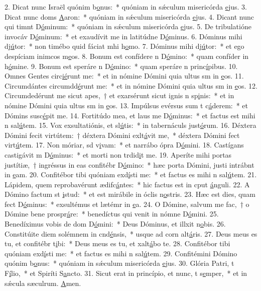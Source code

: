 2. Dicat nunc Israël quónim b\uline{o}nus:~* quóniam in sǽculum misericórda \uline{e}jus.
3. Dicat nunc doms \uline{A}aron:~* quóniam in sǽculum misericórda \uline{e}jus.
4. Dicant nunc qui timnt D\uline{ó}minum:~* quóniam in sǽculum misericórda \uline{e}jus.
5. De tribulatióne invocáv D\uline{ó}minum:~* et exaudívit me in latitúdne D\uline{ó}minus.
6. Dóminus mihi dj\uline{ú}tor:~* non timébo quid fáciat mhi h\uline{o}mo.
7. Dóminus mihi dj\uline{ú}tor:~* et ego despíciam inimcos m\uline{e}os.
8. Bonum est confídere n D\uline{ó}mino:~* quam confíder in h\uline{ó}mine.
9. Bonum est speráre n D\uline{ó}mino:~* quam speráre n princ\uline{í}pibus.
10. Omnes Gentes circ\uline{ié}runt me:~* et in nómine Dómini quia ultus sm in \uline{e}os.
11. Circumdántes circumdd\uline{é}runt me:~* et in nómine Dómini quia ultus sm in \uline{e}os.
12. Circumdedérunt me sicut apes,~† et exarsérunt sicut ignis n sp\uline{i}nis:~* et in nómine Dómini quia ultus sm in \uline{e}os.
13. Impúlsus evérsus sum t c\uline{á}derem:~* et Dómins susc\uline{é}pit me.
14. Fortitúdo mea, et laus me D\uline{ó}minus:~* et factus est mihi n sal\uline{ú}tem.
15. Vox exsultatiónis, et sl\uline{ú}tis:~* in tabernáculs just\uline{ó}rum.
16. Déxtera Dómini fecit virtútem:~† déxtera Dómini exlt\uline{á}vit me,~* déxtera Dómini fect virt\uline{ú}tem.
17. Non móriar, sd v\uline{i}vam:~* et narrábo ópra D\uline{ó}mini.
18. Castígans castigávit m D\uline{ó}minus:~* et morti non trdid\uline{i}t me.
19. Aperíte mihi portas justítiæ,~† ingréssus in eas confitébr D\uline{ó}mino:~* hæc porta Dómini, justi intrábnt in \uline{e}am.
20. Confitébor tibi quóniam exd\uline{í}sti me:~* et factus es mihi n sal\uline{ú}tem.
21. Lápidem, quem reprobavérunt ædifc\uline{á}ntes:~* hic factus est in cput \uline{á}nguli.
22. A Dómino factum st \uline{i}stud:~* et est mirábile in óclis n\uline{o}stris.
23. Hæc est dies, quam fect D\uline{ó}minus:~* exsultémus et lætémr in \uline{e}a.
24. O Dómine, salvum me fac,~† o Dómine bene prospr\uline{á}re:~* benedíctus qui venit in nómne D\uline{ó}mini.
25. Benedíximus vobis de dom D\uline{ó}mini:~* Deus Dóminus, et illxit n\uline{o}bis.
26. Constitúite diem solémnem in cnd\uline{é}nsis,~* usque ad corn alt\uline{á}ris.
27. Deus meus es tu, et confitébr t\uline{i}bi:~* Deus meus es tu, et xalt\uline{á}bo te.
28. Confitébor tibi quóniam exd\uline{í}sti me:~* et factus es mihi n sal\uline{ú}tem.
29. Confitémini Dómino quónim b\uline{o}nus:~* quóniam in sǽculum misericórda \uline{e}jus.
30. Glória Patri, t F\uline{í}lio,~* et Spiríti S\uline{a}ncto.
31. Sicut erat in princípio, et nunc, t s\uline{e}mper,~* et in sǽcula sæculrum. \uline{A}men.

